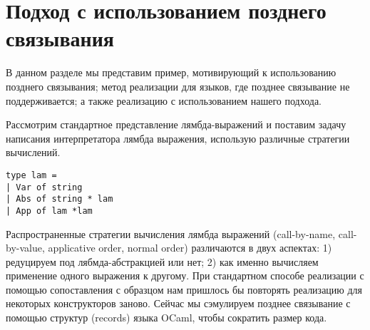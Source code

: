 \section{Подход с использованием позднего связывания}
\label{sec:expo}

В данном разделе мы представим пример, мотивирующий к использованию позднего связывания; метод реализации для языков, где позднее связывание не поддерживается; а также реализацию с использованием нашего подхода.

Рассмотрим стандартное представление лямбда-выражений и поставим задачу написания интерпретатора лямбда выражения, использую различные стратегии вычислений.

\begin{lstlisting}
type lam =
| Var of string
| Abs of string * lam
| App of lam *lam
\end{lstlisting}

\begin{comment}
В этом разделе мы постепенно представим наш подход используя несколько примеров. 
Хотя изложение не предоставляет конкретных деталей и не может использоваться как точная спецификация,
мы здесь предоставляем основные составляющие решения и мотивацию, которая привела к ним.
Далее мы будет использовать следующее соглашение: будем обозначать $\inbr{\dots}$ представление некоторого понятия в конкретном синтаксисе языка \textsc{OCaml}. Например, ``$\inbr{f_t}$`` является обозначением конкретной функции индексированной типом  ``$f$'' для типа ``$t$''. 
В конкретном синтаксисе оно может быть выражено как ``\lstinline{f_t}'', но мы пока воздержимся от указания конкретной формы.
\end{comment}

%

Распространенные стратегии вычисления лямбда выражений (call-by-name, call-by-value, applicative order, normal order) различаются в двух аспектах: 1) редуцируем под лябмда-абстракцией или нет; 2) как именно вычисляем применение одного выражения к другому. При стандартном способе реализации с помощью сопоставления с образцом нам пришлось бы повторять реализацию для некоторых конструкторов заново. Сейчас мы сэмулируем позднее связывание с помощью структур (records) языка OCaml, чтобы сократить размер кода.



